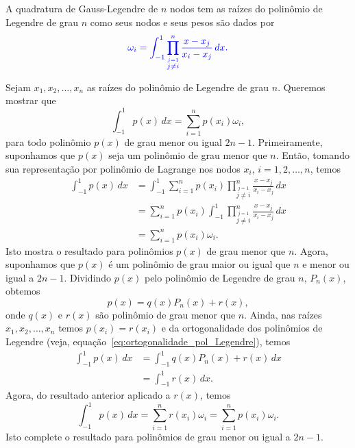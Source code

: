 \begin{teo}\label{teo:Gauss-Legendre}
  A quadratura de Gauss-Legendre de $n$ nodos tem as raízes do polinômio de Legendre de grau $n$ como seus nodos e seus pesos são dados por
  \begin{equation}\label{eq:pesos_Gauss-Legendre_1}\color{blue}\omega_i = \int_{-1}^1 \prod_{\overset{j=1}{j\neq i}}^n \frac{x-x_j}{x_i-x_j}\,dx.
  \end{equation}
\end{teo}
\begin{dem}
  Sejam $x_1, x_2, \dotsc, x_n$ as raízes do polinômio de Legendre de grau $n$. Queremos mostrar que
  \begin{equation}
    \int_{-1}^1 p(x)\,dx = \sum_{i=1}^n p(x_i)\omega_i,
  \end{equation}
para todo polinômio $p(x)$ de grau menor ou igual $2n-1$. Primeiramente, suponhamos que $p(x)$ seja um polinômio de grau menor que $n$. Então, tomando sua representação por polinômio de Lagrange nos nodos $x_i$, $i=1, 2, \ldots, n$, temos
\begin{align}
  \int_{-1}^1 p(x)\,dx &= \int_{-1}^1 \sum_{i=1}^n p(x_i)\prod_{\overset{j=1}{j\neq i}}^n \frac{x-x_j}{x_i-x_j}\,dx\\
  &= \sum_{i=1}^n p(x_i) \int_{-1}^1 \prod_{\overset{j=1}{j\neq i}}^n \frac{x-x_j}{x_i-x_j}\,dx\\
  &= \sum_{i=1}^n p(x_i)\omega_i.
\end{align}
Isto mostra o resultado para polinômios $p(x)$ de grau menor que $n$. Agora, suponhamos que $p(x)$ é um polinômio de grau maior ou igual que $n$ e menor ou igual a $2n-1$. Dividindo $p(x)$ pelo polinômio de Legendre de grau $n$, $P_n(x)$,  obtemos
\begin{equation}
  p(x) = q(x)P_n(x) + r(x),
\end{equation}
onde $q(x)$ e $r(x)$ são polinômio de grau menor que $n$. Ainda, nas raízes $x_1, x_2, \dotsc, x_n$ temos $p(x_i) = r(x_i)$ e da ortogonalidade dos polinômios de Legendre (veja, equação~\eqref{eq:ortogonalidade_pol_Legendre}), temos
\begin{align}
  \int_{-1}^1 p(x)\,dx &= \int_{-1}^1 q(x)P_n(x) + r(x)\,dx\\
  &= \int_{-1}^1 r(x)\,dx.
\end{align}
Agora, do resultado anterior aplicado a $r(x)$, temos
\begin{equation}
  \int_{-1}^1 p(x)\,dx = \sum_{i=1}^n r(x_i)\omega_i = \sum_{i=1}^n p(x_i)\omega_i.
\end{equation}
Isto complete o resultado para polinômios de grau menor ou igual a $2n-1$.
\end{dem}

